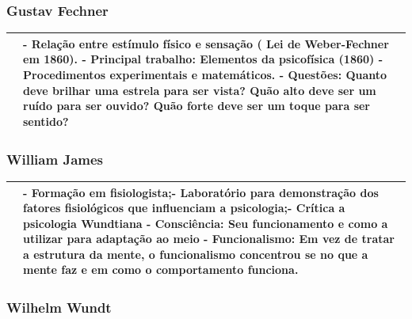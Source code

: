 \documentclass[
]{book}
\begin{document}
\hypertarget{gustav-fechner-1}{%
\subsubsection{Gustav Fechner}\label{gustav-fechner-1}}

\begin{longtable}[]{@{}
  >{\centering\arraybackslash}p{}
  >{\raggedright\arraybackslash}p{}@{}}
\toprule()
\endhead
& - Relação entre estímulo físico e sensação ( Lei de Weber-Fechner em 1860). - Principal trabalho: Elementos da psicofísica (1860) - Procedimentos experimentais e matemáticos. - Questões: Quanto deve brilhar uma estrela para ser vista? Quão alto deve ser um ruído para ser ouvido? Quão forte deve ser um toque para ser sentido? \\
\bottomrule()
\end{longtable}

\hypertarget{william-james-1}{%
\subsubsection{William James}\label{william-james-1}}

\begin{longtable}[]{@{}
  >{\centering\arraybackslash}p{}
  >{\raggedright\arraybackslash}p{}@{}}
\toprule()
\endhead
& - Formação em fisiologista;- Laboratório para demonstração dos fatores fisiológicos que influenciam a psicologia;- Crítica a psicologia Wundtiana - Consciência: Seu funcionamento e como a utilizar para adaptação ao meio - Funcionalismo: Em vez de tratar a \textbf{estrutura da mente}, o \textbf{funcionalismo concentrou} se \textbf{no que a mente faz} e em \textbf{como o comportamento funciona}. \\
\bottomrule()
\end{longtable}

\hypertarget{wilhelm-wundt-1}{%
\subsubsection{Wilhelm Wundt}\label{wilhelm-wundt-1}}
\end{document}
